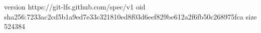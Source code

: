 version https://git-lfs.github.com/spec/v1
oid sha256:7233ac2cd5b1a9ed7e33c321810ed8f03d6eef829be612a2f6fb50c268975fca
size 524384
